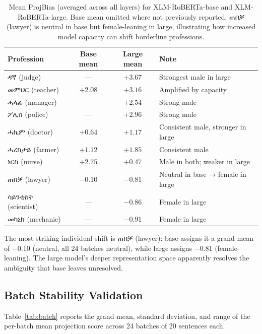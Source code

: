 \documentclass[11pt,a4paper]{article}
\begin{document}
\begin{table}[h]
\centering
\small
\begin{tabular}{lccl}
\toprule
\textbf{Profession} & \textbf{Base mean} & \textbf{Large mean} & \textbf{Note} \\
\midrule
{\ethiopicfont ዳኛ}        (judge)   & ---      & $+3.67$ & Strongest male in large \\
{\ethiopicfont መምህር}      (teacher) & $+2.08$  & $+3.16$ & Amplified by capacity \\
{\ethiopicfont ሓላፊ}       (manager) & ---      & $+2.54$ & Strong male \\
{\ethiopicfont ፖሊስ}       (police)  & ---      & $+2.96$ & Strong male \\
{\ethiopicfont ሓኪም}       (doctor)  & $+0.64$  & $+1.17$ & Consistent male, stronger in large \\
{\ethiopicfont ሓረስታይ}     (farmer)  & $+1.12$  & $+1.85$ & Consistent male \\
{\ethiopicfont ነርስ}        (nurse)   & $+2.75$  & $+0.47$ & Male in both; weaker in large \\
{\ethiopicfont ጠበቓ}       (lawyer)  & $-0.10$  & $-0.81$ & Neutral in base → female in large \\
{\ethiopicfont ሳይንቲስት}    (scientist)& ---     & $-0.86$ & Female in large \\
{\ethiopicfont መካኒክ}      (mechanic) & ---     & $-0.91$ & Female in large \\
\bottomrule
\end{tabular}
\caption{Mean ProjBias (averaged across all layers) for XLM-RoBERTa-base and
XLM-RoBERTa-large. Base mean omitted where not previously reported.
{\ethiopicfont ጠበቓ} (lawyer) is neutral in base but female-leaning in large,
illustrating how increased model capacity can shift borderline professions.}
\label{tab:prof_large}
\end{table}

The most striking individual shift is {\ethiopicfont ጠበቓ} (lawyer): base assigns it a
grand mean of $-0.10$ (neutral, all 24 batches neutral), while large assigns
$-0.81$ (female-leaning). The large model's deeper representation space
apparently resolves the ambiguity that base leaves unresolved.

\subsection{Batch Stability Validation}

Table~\ref{tab:batch} reports the grand mean, standard deviation, and range
of the per-batch mean projection score across 24 batches of 20 sentences each.
\end{document}
